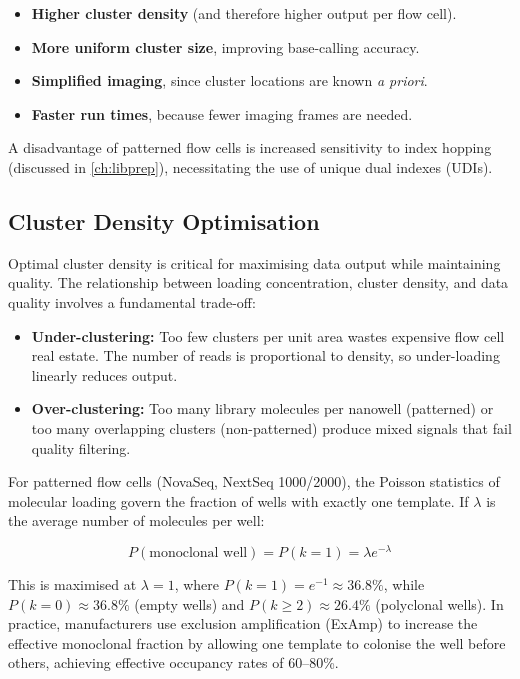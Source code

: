 \begin{itemize}[nosep]
  \item \textbf{Higher cluster density} (and therefore higher output per flow cell).
  \item \textbf{More uniform cluster size}, improving base-calling accuracy.
  \item \textbf{Simplified imaging}, since cluster locations are known \textit{a priori}.
  \item \textbf{Faster run times}, because fewer imaging frames are needed.
\end{itemize}

A disadvantage of patterned flow cells is increased sensitivity to index hopping (discussed in \cref{ch:libprep}), necessitating the use of unique dual indexes (UDIs).


\subsection{Cluster Density Optimisation}
\label{subsec:shortread:cluster-density}

Optimal cluster density is critical for maximising data output while maintaining quality. The relationship between loading concentration, cluster density, and data quality involves a fundamental trade-off:

\begin{itemize}[itemsep=2pt]
  \item \textbf{Under-clustering:} Too few clusters per unit area wastes expensive flow cell real estate. The number of reads is proportional to density, so under-loading linearly reduces output.
  \item \textbf{Over-clustering:} Too many library molecules per nanowell (patterned) or too many overlapping clusters (non-patterned) produce mixed signals that fail quality filtering.
\end{itemize}

For patterned flow cells (NovaSeq, NextSeq 1000/2000), the Poisson statistics of molecular loading govern the fraction of wells with exactly one template. If $\lambda$ is the average number of molecules per well:

\begin{equation}
P(\text{monoclonal well}) = P(k=1) = \lambda e^{-\lambda}
\label{eq:shortread:poisson-loading}
\end{equation}

This is maximised at $\lambda = 1$, where $P(k=1) = e^{-1} \approx 36.8\%$, while $P(k=0) \approx 36.8\%$ (empty wells) and $P(k \geq 2) \approx 26.4\%$ (polyclonal wells). In practice, manufacturers use exclusion amplification (ExAmp) to increase the effective monoclonal fraction by allowing one template to colonise the well before others, achieving effective occupancy rates of 60--80\%.

